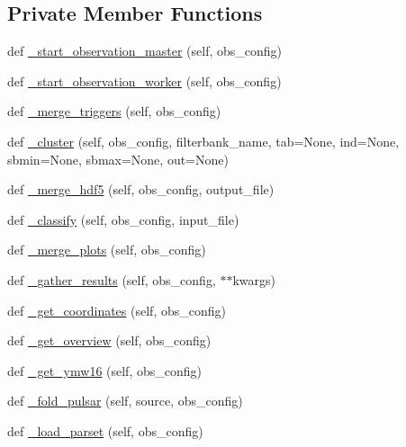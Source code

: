 \subsection*{Private Member Functions}
\begin{DoxyCompactItemize}
\item 
def \mbox{\hyperlink{classdarc_1_1offline__processing_1_1_offline_processing_a337eccf1c9dad9e6f24a047c8715b7d5}{\+\_\+start\+\_\+observation\+\_\+master}} (self, obs\+\_\+config)
\item 
def \mbox{\hyperlink{classdarc_1_1offline__processing_1_1_offline_processing_aa41e6768c0863aeb0266670ef67e02ad}{\+\_\+start\+\_\+observation\+\_\+worker}} (self, obs\+\_\+config)
\item 
def \mbox{\hyperlink{classdarc_1_1offline__processing_1_1_offline_processing_a65fccfa1fa2618873c2d86b5e5b3b7f6}{\+\_\+merge\+\_\+triggers}} (self, obs\+\_\+config)
\item 
def \mbox{\hyperlink{classdarc_1_1offline__processing_1_1_offline_processing_a1cfab9b2b2b47612dbf26ade9f3c36a4}{\+\_\+cluster}} (self, obs\+\_\+config, filterbank\+\_\+name, tab=None, ind=None, sbmin=None, sbmax=None, out=None)
\item 
def \mbox{\hyperlink{classdarc_1_1offline__processing_1_1_offline_processing_a3267c51a62c3022f47423d374833571e}{\+\_\+merge\+\_\+hdf5}} (self, obs\+\_\+config, output\+\_\+file)
\item 
def \mbox{\hyperlink{classdarc_1_1offline__processing_1_1_offline_processing_a2353ffe1274b3217edd28839bdaa2f41}{\+\_\+classify}} (self, obs\+\_\+config, input\+\_\+file)
\item 
def \mbox{\hyperlink{classdarc_1_1offline__processing_1_1_offline_processing_ac1e6e317518b89b7f8475a5f7e002be1}{\+\_\+merge\+\_\+plots}} (self, obs\+\_\+config)
\item 
def \mbox{\hyperlink{classdarc_1_1offline__processing_1_1_offline_processing_a063c95259a4d840c774dd24e960b3d1f}{\+\_\+gather\+\_\+results}} (self, obs\+\_\+config, $\ast$$\ast$kwargs)
\item 
def \mbox{\hyperlink{classdarc_1_1offline__processing_1_1_offline_processing_abffc70755e8cc6a67c4b4475e35fe18f}{\+\_\+get\+\_\+coordinates}} (self, obs\+\_\+config)
\item 
def \mbox{\hyperlink{classdarc_1_1offline__processing_1_1_offline_processing_a4a5ed630ad941ee39f1dace63afabee0}{\+\_\+get\+\_\+overview}} (self, obs\+\_\+config)
\item 
def \mbox{\hyperlink{classdarc_1_1offline__processing_1_1_offline_processing_a24c8331e60cadfcb4ced2a6aeb5faf01}{\+\_\+get\+\_\+ymw16}} (self, obs\+\_\+config)
\item 
def \mbox{\hyperlink{classdarc_1_1offline__processing_1_1_offline_processing_a365b8c9dd4245e94518ed76fb4af522d}{\+\_\+fold\+\_\+pulsar}} (self, source, obs\+\_\+config)
\item 
def \mbox{\hyperlink{classdarc_1_1offline__processing_1_1_offline_processing_a347b007864d5a14e30ac984bc6da1ad7}{\+\_\+load\+\_\+parset}} (self, obs\+\_\+config)
\end{DoxyCompactItemize}



